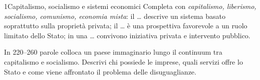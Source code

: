 \begin{lettura}{1}{Capitalismo, socialismo e sistemi economici}
\lingua
Completa con \emph{capitalismo, liberismo, socialismo, comunismo, economia mista}: il \ldots{} descrive un sistema basato soprattutto sulla proprietà privata; il \ldots{} è una prospettiva favorevole a un ruolo limitato dello Stato; in una \ldots{} convivono iniziativa privata e intervento pubblico.

\scrittura
In 220--260 parole colloca un paese immaginario lungo il continuum tra capitalismo e socialismo. Descrivi chi possiede le imprese, quali servizi offre lo Stato e come viene affrontato il problema delle disuguaglianze.

\end{lettura}


